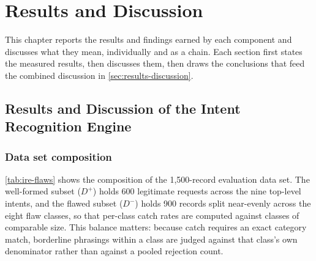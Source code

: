 \chapter{Results and Discussion}\label{ch:results}

This chapter reports the results and findings earned by each component and
discusses what they mean, individually and as a chain. Each section first
states the measured results, then discusses them, then draws the conclusions
that feed the combined discussion in \cref{sec:results-discussion}.

\section{Results and Discussion of the Intent Recognition Engine}\label{sec:results-ire}

\subsection{Data set composition}\label{sec:results-ire-dataset}

\cref{tab:ire-flaws} shows the composition of the 1,500-record evaluation data
set. The well-formed subset (\(D^{+}\)) holds 600 legitimate requests across the
nine top-level intents, and the flawed subset (\(D^{-}\)) holds 900 records split
near-evenly across the eight flaw classes, so that per-class catch rates are
computed against classes of comparable size. This balance matters: because catch
requires an exact category match, borderline phrasings within a class are judged
against that class's own denominator rather than against a pooled rejection
count.

